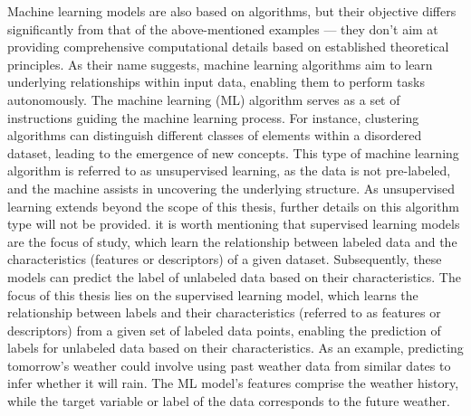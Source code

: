 \documentclass[main]{subfiles}
\begin{document}
Machine learning models are also based on algorithms, but their objective differs significantly from that of the above-mentioned examples --- they don't aim at providing comprehensive computational details based on established theoretical principles. As their name suggests, machine learning algorithms aim to learn underlying relationships within input data, enabling them to perform tasks autonomously. The machine learning (ML) algorithm serves as a set of instructions guiding the machine learning process. For instance, clustering algorithms can distinguish different classes of elements within a disordered dataset, leading to the emergence of new concepts. This type of machine learning algorithm is referred to as unsupervised learning, as the data is not pre-labeled, and the machine assists in uncovering the underlying structure. As unsupervised learning extends beyond the scope of this thesis, further details on this algorithm type will not be provided.  it is worth mentioning that supervised learning models are the focus of study, which learn the relationship between labeled data and the characteristics (features or descriptors) of a given dataset. Subsequently, these models can predict the label of unlabeled data based on their characteristics.
The focus of this thesis lies on the supervised learning model, which learns the relationship between labels and their characteristics (referred to as features or descriptors) from a given set of labeled data points, enabling the prediction of labels for unlabeled data based on their characteristics. As an example, predicting tomorrow's weather could involve using past weather data from similar dates to infer whether it will rain. The ML model's features comprise the weather history, while the target variable or label of the data corresponds to the future weather.
\end{document}
